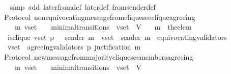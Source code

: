 \begin{isabellebody}
%
\isadelimproof
\ \ %
\endisadelimproof
%
\isatagproof
{}\isamarkupfalse%
\ {\isacharparenleft}simp\ add{\isacharcolon}\ later{\isacharunderscore}from{\isacharunderscore}def\ later{\isacharunderscore}def\ from{\isacharunderscore}sender{\isacharunderscore}def{\isacharparenright}\isanewline
\ \ \isamarkupfalse%
%
\endisatagproof
{\isafoldproof}%
%
\isadelimproof
\isanewline
%
\endisadelimproof
\isanewline
\isanewline
\isanewline
\isanewline
{}\isamarkupfalse%
\ {\isacharparenleft}\ Protocol{\isacharparenright}\ non{\isacharunderscore}equivocating{\isacharunderscore}message{\isacharunderscore}from{\isacharunderscore}clique{\isacharunderscore}see{\isacharunderscore}clique{\isacharunderscore}agreeing\ {\isacharcolon}\isanewline
\ \ {\isachardoublequoteopen}{\isasymforall}\ {\isasymsigma}\ {\isasymsigma}{\isacharprime}\ m{\isacharprime}\ v{\isacharunderscore}set{\isachardot}\ {\isacharparenleft}{\isasymsigma}{\isacharcomma}\ {\isasymsigma}{\isacharprime}{\isacharparenright}\ {\isasymin}\ minimal{\isacharunderscore}transitions\ {\isasymand}\ v{\isacharunderscore}set\ {\isasymsubseteq}\ V\isanewline
\ \ {\isasymlongrightarrow}\ m{\isacharprime}\ {\isacharequal}\ the{\isacharunderscore}elem\ {\isacharparenleft}{\isasymsigma}{\isacharprime}\ {\isacharminus}\ {\isasymsigma}{\isacharparenright}\isanewline
\ \ {\isasymlongrightarrow}\ is{\isacharunderscore}clique\ {\isacharparenleft}v{\isacharunderscore}set{\isacharcomma}\ p{\isacharcomma}\ {\isasymsigma}{\isacharparenright}\ {\isasymand}\ sender\ m{\isacharprime}\ {\isasymin}\ v{\isacharunderscore}set\ {\isasymand}\ sender\ m{\isacharprime}\ {\isasymnotin}\ equivocating{\isacharunderscore}validators\ {\isasymsigma}{\isacharprime}\ \isanewline
\ \ {\isasymlongrightarrow}\ v{\isacharunderscore}set\ {\isasymsubseteq}\ agreeing{\isacharunderscore}validators\ {\isacharparenleft}p{\isacharcomma}\ justification\ m{\isacharprime}{\isacharparenright}{\isachardoublequoteclose}\isanewline
%
\isadelimproof
\ \ %
\endisadelimproof
%
\isatagproof
{}\isamarkupfalse%
%
\endisatagproof
{\isafoldproof}%
%
\isadelimproof
\isanewline
%
\endisadelimproof
\isanewline
\isanewline
\isanewline
\isanewline
{}\isamarkupfalse%
\ {\isacharparenleft}\ Protocol{\isacharparenright}\ new{\isacharunderscore}message{\isacharunderscore}from{\isacharunderscore}majority{\isacharunderscore}clique{\isacharunderscore}see{\isacharunderscore}members{\isacharunderscore}agreeing\ {\isacharcolon}\isanewline
\ \ {\isachardoublequoteopen}{\isasymforall}\ {\isasymsigma}\ {\isasymsigma}{\isacharprime}\ m{\isacharprime}\ v{\isacharunderscore}set{\isachardot}\ {\isacharparenleft}{\isasymsigma}{\isacharcomma}\ {\isasymsigma}{\isacharprime}{\isacharparenright}\ {\isasymin}\ minimal{\isacharunderscore}transitions\ {\isasymand}\ v{\isacharunderscore}set\ {\isasymsubseteq}\ V\isanewline

\end{isabellebody}
